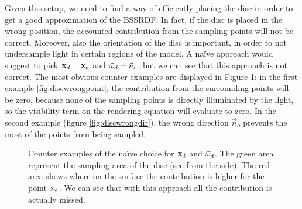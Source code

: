 Given this setup, we need to find a way of efficiently placing the disc in order to get a good approximation of the BSSRDF. In fact, if the disc is placed in the wrong position, the accounted contribution from the sampling points will not be correct. Moreover, also the orientation of the disc is important, in order to not undersample light in certain regions of the model. A na\"{i}ve approach would suggest to pick $\mathbf{x}_d = \mathbf{x}_o$ and $\vec{\omega}_d = \vec{n}_o$, but we can see that this approach is not correct. The most obvious counter examples are displayed in Figure \ref{fig:discwrong}: in the first example \ref{fig:discwrongpoint}, the contribution from the surrounding points will be zero, because none of the sampling points is directly illuminated by the light, so the visibility term on the rendering equation will evaluate to zero. In the second example (figure \ref{fig:discwrongdir}), the wrong direction $\vec{n}_o$ prevents the most of the points from being sampled.
\begin{figure}
\centering
{}
\caption{Counter examples of the na\"{i}ve choice for $\mathbf{x}_d$ and $\vec{\omega}_d$. The green area represent the sampling area of the disc (see from the side). The red area shows where on the surface the contribution is higher for the point $\mathbf{x}_o$. We can see that with this approach all the contribution is actually missed.}
\label{fig:discwrong}
\end{figure}
